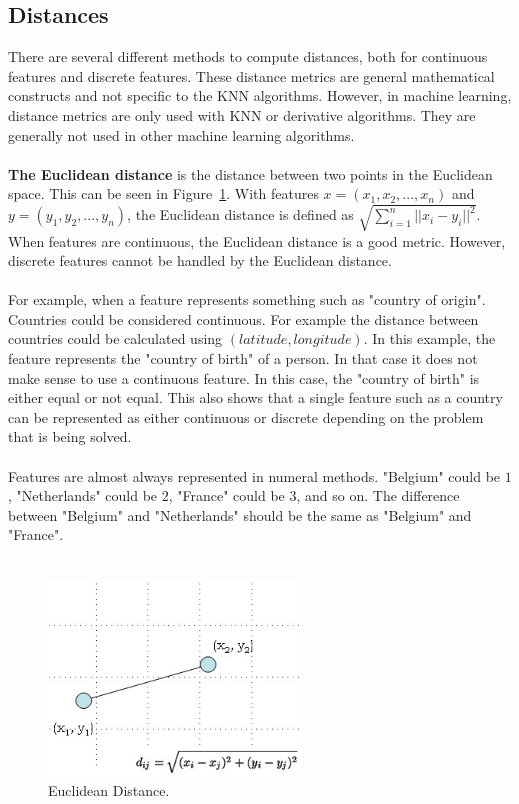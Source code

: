 \subsection{Distances}
There are several different methods to compute distances, both for continuous features and discrete features. These distance metrics are general mathematical constructs and not specific to the KNN algorithms. However, in machine learning, distance metrics are only used with KNN or derivative algorithms. They are generally not used in other machine learning algorithms. \\
\\
\noindent \textbf{The Euclidean distance} is the distance between two points in the Euclidean space. This can be seen in Figure~\ref{fig:euclideanDistance}. With features $x = (x_1, x_2,..., x_n)$ and $y = (y_1, y_2,..., y_n)$, the Euclidean distance is defined as $\sqrt{\sum_{i=1}^{n}||x_i-y_i||^2}$. When features are continuous, the Euclidean distance is a good metric. However, discrete features cannot be handled by the Euclidean distance. \cite{euclideanDistanceExplain} \\
\\
For example, when a feature represents something such as "country of origin". Countries could be considered continuous. For example the distance between countries could be calculated using $(latitude, longitude)$. In this example, the feature represents the "country of birth" of a person. In that case it does not make sense to use a continuous feature. In this case, the "country of birth" is either equal or not equal. This also shows that a single feature such as a country can be represented as either continuous or discrete depending on the problem that is being solved.\\
\\
Features are almost always represented in numeral methods. "Belgium" could be $1$, "Netherlands" could be $2$, "France" could be $3$, and so on. The difference between "Belgium" and "Netherlands" should be the same as "Belgium" and "France".  \\\\

\begin{figure}[H]
\centering
\includegraphics[width=0.6\textwidth]{Figures/euclideanDistance}
\decoRule
\caption[Euclidean Distance]{Euclidean Distance. \cite{euclideanDistance}}
\label{fig:euclideanDistance}
\end{figure}

